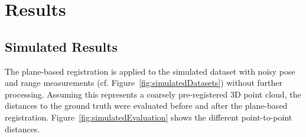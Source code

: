 \section{Results}

\subsection{Simulated Results}

The plane-based registration is applied to the simulated dataset with noisy pose and range measurements (cf. Figure~\ref{fig:simulatedDatasets}) without further processing.
Assuming this represents a coarsely pre-registered 3D point cloud, the distances to the ground truth were evaluated before and after the plane-based registration. 
Figure~\ref{fig:simulatedEvaluation} shows the different point-to-point distances. 


